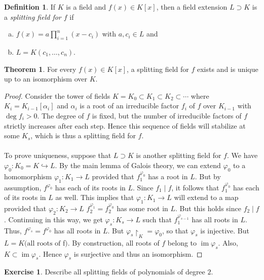 \documentclass[10pt,letterpaper,cm]{nupset}
\theoremstyle{definition}
\newtheorem*{definition}{Definition}
\newtheorem{theorem}{Theorem}
\newtheorem{exercise}{Exercise}
\newcommand{\1}{\mathbf{1}}
\newcommand{\0}{\vec 0}
\DeclareMathOperator{\im}{im}
\begin{document}
\begin{definition}
If $K$ is a field and $f(x) \in K[x]$, then a field extension $L \supset K$ is a \textit{splitting field for $f$} if
\begin{enumerate}[(a)]
\item $f(x) = a \prod_{i=1}^n (x-c_i)$ with $a, c_i \in L$ and
\item $L = K(c_1, \ldots, c_n)$.
\end{enumerate}
\end{definition}

\begin{theorem}
 For every $f(x) \in K[x]$, a splitting field for $f$ exists and is unique up to an isomorphism over $K$.
\end{theorem}
\begin{proof}
Consider the tower of fields $K= K_0 \subset K_1 \subset K_2 \subset \cdots$ where $K_i = K_{i-1}[\alpha_i]$ and $\alpha_i$ is a root of an irreducible factor $f_i$ of $f$ over $K_{i-1}$ with $\deg{f_i}>0$. The degree of $f$ is fixed, but the number of irreducible factors of $f$ strictly increases after each step. Hence this sequence of fields will stabilize at some $K_s$, which is thus a splitting field for $f$. 
\\ \\ To prove uniqueness, suppose that $L \supset K$ is another splitting field for $f$. We have $\varphi_0 : K_0 = K \hookrightarrow L$. By the main lemma of Galois theory, we can extend $\varphi_0 $ to a homomorphism $\varphi_1 : K_1 \to L$ provided that $f_1^{\varphi_0}$ has a root in $L$. But by assumption, $f^{\varphi_0}$ has each of its roots in $L$. Since $f_1 \mid f$, it follows that $f_1^{\varphi_0}$ has each of its roots in $L$ as well. This implies that $\varphi_1 : K_1 \to L$ will extend to a map provided that $\varphi_2 : K_2 \to L$ $f_2^{\varphi_1} = f_2^{\varphi_0}$ has some root in $L$.  But this holds since $f_2 \mid f$. Continuing in this way, we get $\varphi_s : K_s \to L$ such that $f_1^{\varphi_{s-1}}$ has all roots in $L$. Thus, $f^{\varphi_s} = f^{\varphi_0}$ has all roots in $L$. But $\varphi_s \restriction_K = \varphi_0$, so that $\varphi_s$ is injective. But $L = K(\text{all roots of } $f$)$. By construction, all roots of $f$ belong to $\im{\varphi_s}$. Also, $K \subset \im{\varphi_s}$. Hence $\varphi_s$ is surjective and thus an isomorphism.
\end{proof}

\begin{exercise}
Describe all splitting fields of polynomials of degree $2$.
\end{exercise}
\end{document}
